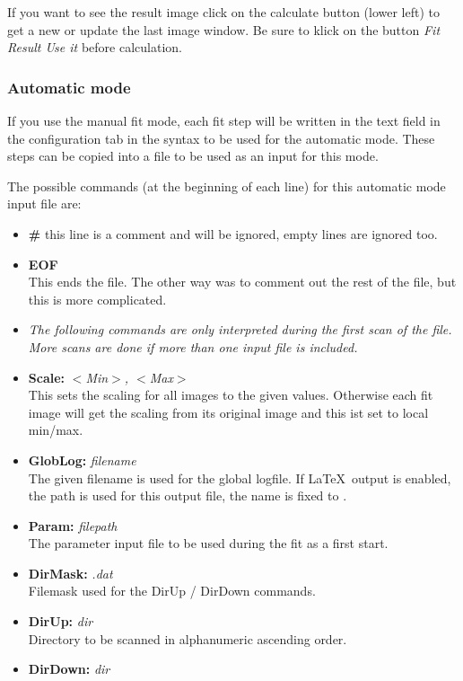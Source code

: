 \documentclass[11pt]{article} %
\begin{document}
If you want to see the result image click on the calculate button (lower left) to get a new or update the last image window. Be sure to klick on the button {\it Fit Result Use it} before calculation.

\subsubsection{Automatic mode}

If you use the manual fit mode, each fit step will be written in the text field in the configuration tab in the syntax to be used for the automatic mode. These steps can be copied into a file to be used as an input for this mode.

The possible commands (at the beginning of each line) for this automatic mode input file are:
\begin{itemize}\itemsep0pt
\item {\bf \#} this line is a comment and will be ignored, empty lines are ignored too.
\item {\bf EOF} \\
	This ends the file. The other way was to comment out the rest of the file, but this is more complicated.
\item[] {\it The following commands are only interpreted during the first scan of the file. More scans are done if more than one input file is included.}
\item {\bf Scale:} {\it $<$Min$>$, $<$Max$>$} \\
	This sets the scaling for all images to the given values. Otherwise each fit image will get the scaling from its original image and this ist set to local min/max.
\item {\bf GlobLog:} {\it filename} \\
	The given filename is used for the global logfile. If \LaTeX\  output is enabled, the path is used for this output file, the name is fixed to .
\item {\bf Param:} {\it filepath} \\
	The parameter input file to be used during the fit as a first start.
\item {\bf DirMask:} {\it *.dat} \\
	Filemask used for the DirUp / DirDown commands.
\item {\bf DirUp:} {\it dir} \\
	Directory to be scanned in alphanumeric ascending order.
\item {\bf DirDown:} {\it dir} \\

\end{itemize}
\end{document}
